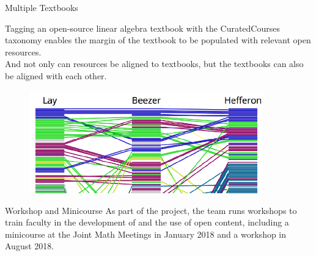 \begin{sectionblock}{Multiple Textbooks}

  Tagging an open-source linear algebra textbook with the
  CuratedCourses taxonomy enables the margin of the textbook to be populated with relevant open
  resources.\\[1ex]

  And not only can resources be aligned to textbooks, but the textbooks can also be aligned with each other.

  \begin{figure}
    \includegraphics[width=0.9\textwidth]{alignment.pdf}
  \end{figure}


\end{sectionblock}



\begin{sectionblock}{Workshop and Minicourse}
  As part of the project, the team runs workshops to train
  faculty in the development of and the use of open content, including
  a minicourse at the Joint Math Meetings in January 2018 and a
   workshop in August 2018.


\end{sectionblock}


